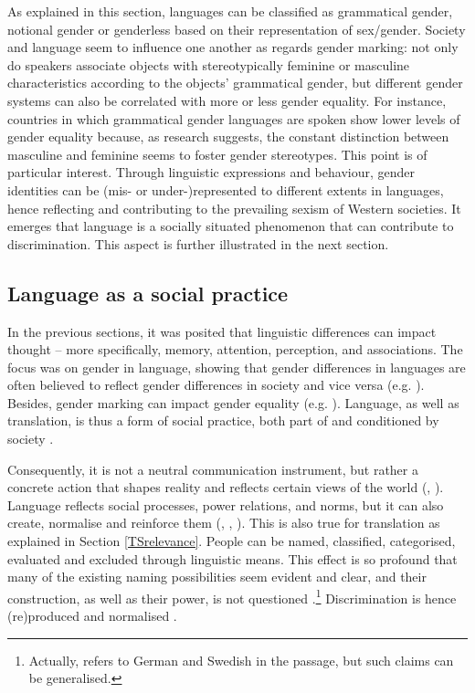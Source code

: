 As explained in this section, languages can be classified as grammatical gender, notional gender or genderless based on their representation of sex/gender. Society and language seem to influence one another as regards gender marking: not only do speakers associate objects with stereotypically feminine or masculine characteristics according to the objects’ grammatical gender, but different gender systems can also be correlated with more or less gender equality. For instance, countries in which grammatical gender languages are spoken show lower levels of gender equality because, as research suggests, the constant distinction between masculine and feminine seems to foster gender stereotypes. This point is of particular interest. Through linguistic expressions and behaviour, gender identities can be (mis- or under-)represented to different extents in languages, hence reflecting and contributing to the prevailing sexism of Western societies. It emerges that language is a socially situated phenomenon that can contribute to discrimination. This aspect is further illustrated in the next section.

\subsection{Language as a social practice} \label{languapepowerdiscrimination}
In the previous sections, it was posited that linguistic differences can impact thought -- more specifically, memory, attention, perception, and associations. The focus was on gender in language, showing that gender differences in languages are often believed to reflect gender differences in society and vice versa (e.g. \cite{boroditsky2003sex}). Besides, gender marking can impact gender equality (e.g. \cite{santacreu2013female}). Language, as well as translation, is thus a form of social practice, both part of and conditioned by society \citep[55f]{fairclough2015language}. 

Consequently, it is not a neutral communication instrument, but rather a concrete action that shapes reality and reflects certain views of the world (\cite[7]{sprachhandeln2015tun}, \cite[79]{kramer2016feminist}). Language reflects social processes, power relations, and norms, but it can also create, normalise and reinforce them (\cite[55f]{fairclough2015language}, \cite[11]{sprachhandeln2015tun}, \cite[71]{kramer2016feminist}). This is also true for translation \citep{tymoczko2002introduction} as explained in Section \ref{TSrelevance}. People can be named, classified, categorised, evaluated and excluded through linguistic means. This effect is so profound that many of the existing naming possibilities seem evident and clear, and their construction, as well as their power, is not questioned \citep[11]{hornscheidt2008gender}.\footnote{Actually, \textcite[11]{hornscheidt2008gender} refers to German and Swedish in the passage, but such claims can be generalised.} Discrimination is hence (re)produced and normalised \citep[11f]{sprachhandeln2015tun}. 

